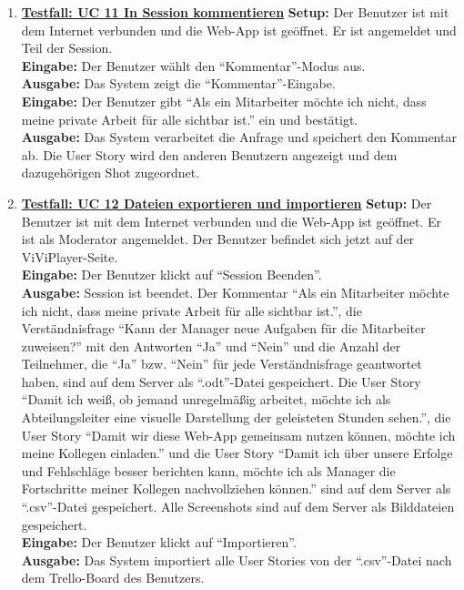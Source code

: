 \begin{enumerate}
	\item \underline{\textbf{Testfall: UC 11 In Session kommentieren}} \linebreak
	\textbf{Setup:} Der Benutzer ist mit dem Internet verbunden und die Web-App ist geöffnet. Er ist angemeldet und Teil der Session.\\
	\textbf{Eingabe:} Der Benutzer wählt den ``Kommentar''-Modus aus. \\
	\textbf{Ausgabe:} Das System zeigt die ``Kommentar''-Eingabe. \\
	\textbf{Eingabe:} Der Benutzer gibt ``Als ein Mitarbeiter möchte ich nicht, dass meine private 
	Arbeit für alle sichtbar ist.'' ein und bestätigt.\\
	\textbf{Ausgabe:} Das System verarbeitet die Anfrage und speichert den Kommentar ab. Die User Story wird den anderen Benutzern angezeigt und dem dazugehörigen Shot zugeordnet.
	
	\item \underline{\textbf{Testfall: UC 12 Dateien exportieren und importieren}} \linebreak
	\textbf{Setup:} Der Benutzer ist mit dem Internet verbunden und die Web-App ist geöffnet. Er ist als Moderator angemeldet. Der Benutzer befindet sich jetzt auf der ViViPlayer-Seite. \\
	\textbf{Eingabe:} Der Benutzer klickt auf ``Session Beenden''.\\
	\textbf{Ausgabe:} Session ist beendet. Der Kommentar ``Als ein Mitarbeiter möchte ich nicht, dass meine private Arbeit für alle sichtbar ist.'', die Verständnisfrage ``Kann der Manager neue Aufgaben für die Mitarbeiter zuweisen?'' mit den Antworten ``Ja'' und ``Nein'' und die Anzahl der Teilnehmer, die ``Ja'' bzw. ``Nein'' für jede Verständnisfrage geantwortet haben, sind auf dem Server als ``.odt''-Datei gespeichert. Die User Story ``Damit ich weiß, ob jemand unregelmäßig arbeitet, möchte ich als Abteilungsleiter eine visuelle Darstellung der geleisteten Stunden sehen.'', die User Story ``Damit wir diese Web-App gemeinsam nutzen können, möchte ich meine Kollegen einladen.'' und die User Story ``Damit ich über unsere Erfolge und Fehlschläge besser berichten kann, möchte ich als Manager die Fortschritte meiner Kollegen nachvollziehen können.'' sind auf dem Server als ``.csv''-Datei gespeichert. Alle Screenshots sind auf dem Server als Bilddateien gespeichert.\\
	\textbf{Eingabe:} Der Benutzer klickt auf ``Importieren''. \\
	\textbf{Ausgabe:} Das System importiert alle User Stories von der ``.csv''-Datei nach dem Trello-Board 
	des Benutzers.\\ 
	

\end{enumerate}
